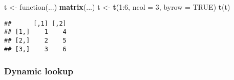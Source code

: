 \documentclass[11,]{article}
\newenvironment{Shaded}{\begin{snugshade}}{\end{snugshade}}
\newcommand{\KeywordTok}[1]{\textcolor[rgb]{0.13,0.29,0.53}{\textbf{{#1}}}}
\newcommand{\DataTypeTok}[1]{\textcolor[rgb]{0.13,0.29,0.53}{{#1}}}
\newcommand{\DecValTok}[1]{\textcolor[rgb]{0.00,0.00,0.81}{{#1}}}
\newcommand{\StringTok}[1]{\textcolor[rgb]{0.31,0.60,0.02}{{#1}}}
\newcommand{\OtherTok}[1]{\textcolor[rgb]{0.56,0.35,0.01}{{#1}}}
\newcommand{\NormalTok}[1]{{#1}}
\begin{document}
\begin{Shaded}
\begin{Highlighting}[]
\NormalTok{t <-}\StringTok{ }\NormalTok{function(...) }\KeywordTok{matrix}\NormalTok{(...)}
\NormalTok{t <-}\StringTok{ }\KeywordTok{t}\NormalTok{(}\DecValTok{1}\NormalTok{:}\DecValTok{6}\NormalTok{, }\DataTypeTok{ncol =} \DecValTok{3}\NormalTok{, }\DataTypeTok{byrow =} \OtherTok{TRUE}\NormalTok{)}
\KeywordTok{t}\NormalTok{(t)}
\end{Highlighting}
\end{Shaded}

\begin{verbatim}
##      [,1] [,2]
## [1,]    1    4
## [2,]    2    5
## [3,]    3    6
\end{verbatim}

\subsubsection{Dynamic lookup}\label{dynamic-lookup}
\end{document}
